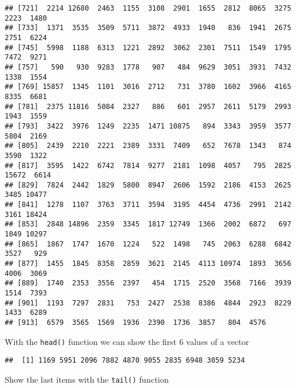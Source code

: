 \documentclass[
]{article}
\newenvironment{Shaded}{\begin{snugshade}}{\end{snugshade}}
\newcommand{\DecValTok}[1]{\textcolor[rgb]{0.00,0.00,0.81}{#1}}
\newcommand{\FunctionTok}[1]{\textcolor[rgb]{0.00,0.00,0.00}{#1}}
\newcommand{\NormalTok}[1]{#1}
\newcommand{\SpecialCharTok}[1]{\textcolor[rgb]{0.00,0.00,0.00}{#1}}
\begin{document}
\begin{verbatim}
## [721]  2214 12680  2463  1155  3108  2901  1655  2812  8065  3275  2223  1480
## [733]  1371  3535  3509  5711  3872  4933  1940   836  1941  2675  2751  6224
## [745]  5998  1188  6313  1221  2892  3062  2301  7511  1549  1795  7472  9271
## [757]   590   930  9283  1778   907   484  9629  3051  3931  7432  1338  1554
## [769] 15857  1345  1101  3016  2712   731  3780  1602  3966  4165  8335  6681
## [781]  2375 11816  5084  2327   886   601  2957  2611  5179  2993  1943  1559
## [793]  3422  3976  1249  2235  1471 10875   894  3343  3959  3577  5804  2169
## [805]  2439  2210  2221  2389  3331  7409   652  7678  1343   874  3590  1322
## [817]  3595  1422  6742  7814  9277  2181  1098  4057   795  2825 15672  6614
## [829]  7824  2442  1829  5800  8947  2606  1592  2186  4153  2625  3485 10477
## [841]  1278  1107  3763  3711  3594  3195  4454  4736  2991  2142  3161 18424
## [853]  2848 14896  2359  3345  1817 12749  1366  2002  6872   697  1049 10297
## [865]  1867  1747  1670  1224   522  1498   745  2063  6288  6842  3527   929
## [877]  1455  1845  8358  2859  3621  2145  4113 10974  1893  3656  4006  3069
## [889]  1740  2353  3556  2397   454  1715  2520  3568  7166  3939  1514  7393
## [901]  1193  7297  2831   753  2427  2538  8386  4844  2923  8229  1433  6289
## [913]  6579  3565  1569  1936  2390  1736  3857   804  4576
\end{verbatim}

With the \texttt{head()} function we can show the first 6 values of a
vector

\begin{Shaded}
\end{Shaded}

\begin{verbatim}
##  [1] 1169 5951 2096 7882 4870 9055 2835 6948 3059 5234
\end{verbatim}

Show the last items with the \texttt{tail()} function

\begin{Shaded}
\end{Shaded}
\end{document}

